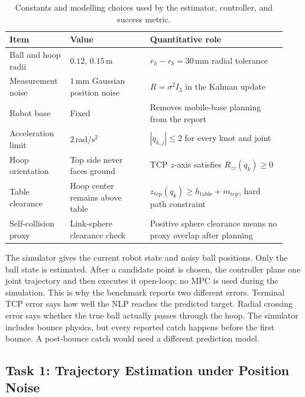 \documentclass[a4paper,10pt]{article}
\begin{document}
\begin{table}[H]
\centering
\caption{Constants and modelling choices used by the estimator, controller, and success metric.}
\label{tab:assumptions}
\begin{tabular}{@{}p{0.20\linewidth}p{0.27\linewidth}p{0.46\linewidth}@{}}
\toprule
Item & Value & Quantitative role \\
\midrule
Ball and hoop radii & \(0.12,\,0.15\,\mathrm{m}\) & \(r_h-r_b=30\,\mathrm{mm}\) radial tolerance \\
Measurement noise & \(1\,\mathrm{mm}\) Gaussian position noise & \(R=\sigma^2 I_3\) in the Kalman update \\
Robot base & Fixed & Removes mobile-base planning from the report \\
Acceleration limit & \(2\,\mathrm{rad/s^2}\) & \(|\ddot q_{k,j}|\le2\) for every knot and joint \\
Hoop orientation & Top side never faces ground & TCP \(z\)-axis satisfies \(R_{zz}(q_k)\ge0\) \\
Table clearance & Hoop center remains above table & \(z_{\mathrm{tcp}}(q_k)\ge h_{\mathrm{table}}+m_{\mathrm{tcp}}\), hard path constraint \\
Self-collision proxy & Link-sphere clearance check & Positive sphere clearance means no proxy overlap after planning \\
\bottomrule
\end{tabular}
\end{table}

The simulator gives the current robot state and noisy ball positions. Only the ball state is estimated. After a candidate point is chosen, the controller plans one joint trajectory and then executes it open-loop; no MPC is used during the simulation. This is why the benchmark reports two different errors. Terminal TCP error says how well the NLP reaches the predicted target. Radial crossing error says whether the true ball actually passes through the hoop. The simulator includes bounce physics, but every reported catch happens before the first bounce. A post-bounce catch would need a different prediction model.

\subsection*{Task 1: Trajectory Estimation under Position Noise}
\end{document}
